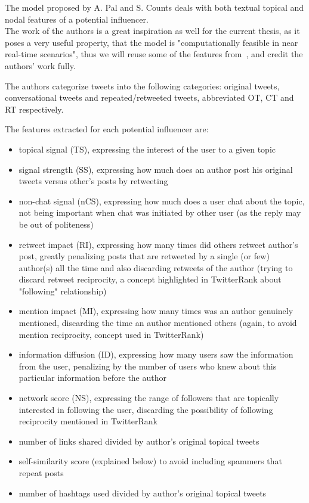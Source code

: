 The model proposed by A. Pal and S. Counts\cite{microblogs} deals with both textual topical and nodal features of a potential influencer.\\
The work of the authors is a great inspiration as well for the current thesis, as it poses a very useful property, that the model is "computationally feasible in near real-time scenarios", thus we will reuse some of the features from\ \cite{microblogs}, and credit the authors' work fully.

The authors categorize tweets into the following categories: original tweets, conversational tweets and repeated/retweeted tweets, abbreviated OT, CT and RT respectively.

The features extracted for each potential influencer are:
\begin{itemize}
	\item topical signal (TS), expressing the interest of the user to a given topic
    \item signal strength (SS), expressing how much does an author post his original tweets versus other's posts by retweeting
    \item non-chat signal (nCS), expressing how much does a user chat about the topic, not being important when chat was initiated by other user (as the reply may be out of politeness)
    \item retweet impact (RI), expressing how many times did others retweet author's post, greatly penalizing posts that are retweeted by a single (or few) author(s) all the time and also discarding retweets of the author (trying to discard retweet reciprocity, a concept highlighted in TwitterRank\cite{twitterrank} about "following" relationship)
    \item mention impact (MI), expressing how many times was an author genuinely mentioned, discarding the time an author mentioned others (again, to avoid mention reciprocity, concept used in TwitterRank\cite{twitterrank})
    \item information diffusion (ID), expressing how many users saw the information from the user, penalizing by the number of users who knew about this particular information before the author
    \item network score (NS), expressing the range of followers that are topically interested in following the user, discarding the possibility of following reciprocity mentioned in TwitterRank\cite{twitterrank}
    \item number of links shared divided by author's original topical tweets
    \item self-similarity score (explained below) to avoid including spammers that repeat posts
    \item number of hashtags used divided by author's original topical tweets
\end{itemize}

